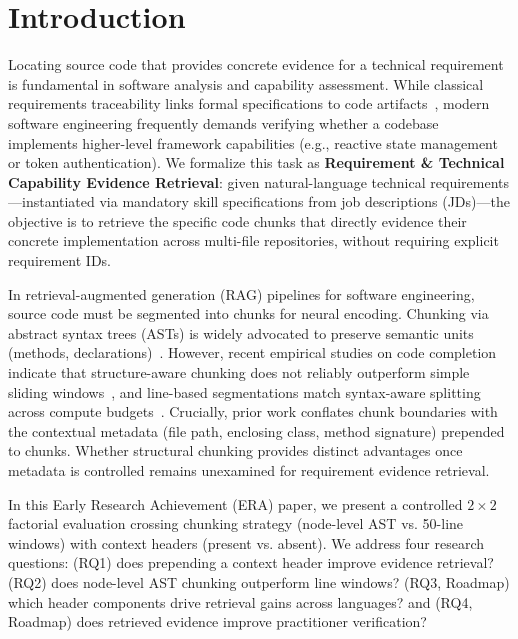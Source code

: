 \section{Introduction}
\label{sec:intro}

Locating source code that provides concrete evidence for a technical requirement is fundamental in software analysis and capability assessment. 
While classical requirements traceability links formal specifications to code artifacts~\cite{antoniol2002traceability,gao2024triad}, modern software engineering frequently demands verifying whether a codebase implements higher-level framework capabilities (e.g., reactive state management or token authentication). 
We formalize this task as \textbf{Requirement \& Technical Capability Evidence Retrieval}: given natural-language technical requirements---instantiated via mandatory skill specifications from job descriptions (JDs)---the objective is to retrieve the specific code chunks that directly evidence their concrete implementation across multi-file repositories, without requiring explicit requirement IDs.

In retrieval-augmented generation (RAG) pipelines for software engineering, source code must be segmented into chunks for neural encoding. 
Chunking via abstract syntax trees (ASTs) is widely advocated to preserve semantic units (methods, declarations)~\cite{zhang2025cast}. 
However, recent empirical studies on code completion indicate that structure-aware chunking does not reliably outperform simple sliding windows~\cite{wu2026chunking}, and line-based segmentations match syntax-aware splitting across compute budgets~\cite{galimzyanov2025practical}. 
Crucially, prior work conflates chunk boundaries with the contextual metadata (file path, enclosing class, method signature) prepended to chunks. 
Whether structural chunking provides distinct advantages once metadata is controlled remains unexamined for requirement evidence retrieval.

In this Early Research Achievement (ERA) paper, we present a controlled $2 \times 2$ factorial evaluation crossing chunking strategy (node-level AST vs. 50-line windows) with context headers (present vs. absent). We address four research questions: (RQ1) does prepending a context header improve evidence retrieval? (RQ2) does node-level AST chunking outperform line windows? (RQ3, Roadmap) which header components drive retrieval gains across languages? and (RQ4, Roadmap) does retrieved evidence improve practitioner verification?

